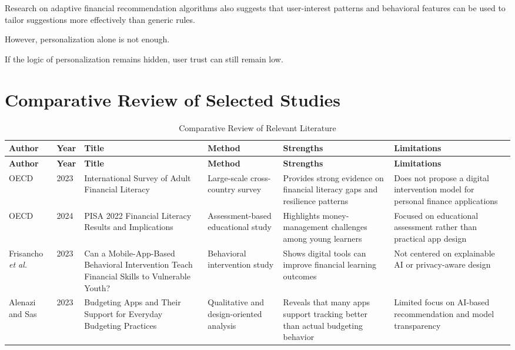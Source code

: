 \documentclass[12pt,a4paper]{report}
\begin{document}
Research on adaptive financial recommendation algorithms also suggests that user-interest patterns and behavioral features can be used to tailor suggestions more effectively than generic rules.

However,
personalization alone is not enough.

If the logic of personalization remains hidden,
user trust can still remain low.

\section{Comparative Review of Selected Studies}
\begingroup
\small
\setlength{\LTleft}{0pt}
\setlength{\LTright}{0pt}
\begin{longtable}{p{2.1cm}p{0.9cm}p{2.6cm}p{2.5cm}p{2.6cm}p{2.6cm}}
\caption{Comparative Review of Relevant Literature}
\label{tab:literaturecomparison}\\
\toprule
\textbf{Author} &
\textbf{Year} &
\textbf{Title} &
\textbf{Method} &
\textbf{Strengths} &
\textbf{Limitations} \\
\midrule
\endfirsthead
\toprule
\textbf{Author} &
\textbf{Year} &
\textbf{Title} &
\textbf{Method} &
\textbf{Strengths} &
\textbf{Limitations} \\
\midrule
\endhead
OECD &
2023 &
International Survey of Adult Financial Literacy &
Large-scale cross-country survey &
Provides strong evidence on financial literacy gaps and resilience patterns &
Does not propose a digital intervention model for personal finance applications \\

OECD &
2024 &
PISA 2022 Financial Literacy Results and Implications &
Assessment-based educational study &
Highlights money-management challenges among young learners &
Focused on educational assessment rather than practical app design \\

Frisancho \textit{et al.} &
2023 &
Can a Mobile-App-Based Behavioral Intervention Teach Financial Skills to Vulnerable Youth? &
Behavioral intervention study &
Shows digital tools can improve financial learning outcomes &
Not centered on explainable AI or privacy-aware design \\

Alenazi and Sas &
2023 &
Budgeting Apps and Their Support for Everyday Budgeting Practices &
Qualitative and design-oriented analysis &
Reveals that many apps support tracking better than actual budgeting behavior &
Limited focus on AI-based recommendation and model transparency \\


\end{longtable}
\end{document}
